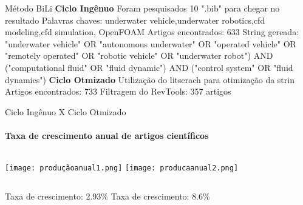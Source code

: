 \begin{frame}[t]{Método BiLi}
    \textbf{Ciclo Ingênuo} 
    \newline
        Foram pesquisados 10 ".bib" para chegar no resultado 
    \newline
        Palavras chaves: underwater vehicle,underwater robotics,cfd modeling,cfd simulation, OpenFOAM
    \newline
        Artigos encontrados: 633
    \newline
        String gereada: "underwater vehicle" OR "autonomous underwater" OR "operated vehicle" OR
        "remotely operated" OR "robotic vehicle" OR "underwater robot") AND ("computational fluid" OR "fluid dynamic") 
        AND ("control system" OR "fluid dynamics")
    \newline
    \textbf{Ciclo Otmizado}
    \newline
        Utilização do litserach para otimização da strin
    \newline
        Artigos encontrados: 733
    \newline
        Filtragem do RevTools: 357 artigos

\end{frame}
\begin{frame}[t]{Ciclo Ingênuo X Ciclo Otmizado}
    \transboxout[duration=0.5]
    \framesubtitle{Taxa de crescimento anual de artigos científicos}
    
    \begin{columns}
        \newline  
            \texttt{[image: produçãoanual1.png]}
        \newline  
         \texttt{[image: producaanual2.png]}
    \end{columns}
    
    \begin{columns}
        \newline  
        Taxa de crescimento: 2.93\%
        \newline
         Taxa de crescimento: 8.6\%
    \end{columns}
\end{frame}
